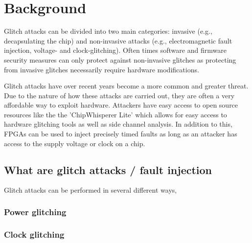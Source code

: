 

\chapter{Background}
\label{chap3}

Glitch attacks can be divided into two main categories: invasive (e.g., decapsulating the chip) and non-invasive attacks (e.g., electromagnetic fault injection, voltage- and clock-glitching)\cite{glitchresistor}. Often times software and firmware security measures can only protect against non-invasive glitches as protecting from invasive glitches necessarily require hardware modifications. 

Glitch attacks have over recent years become a more common and greater threat. Due to the nature of how these attacks are carried out, they are often a very affordable way to exploit hardware. Attackers have easy access to open source resources like the the 'ChipWhisperer Lite' which allows for easy access to hardware glitching tools as well as side channel analysis\cite{chipWhisperer}. In addition to this, FPGAs can be used to inject precisely timed faults as long as an attacker has access to the supply voltage or clock on a chip\cite{hole_in_soc}. 

\section{What are glitch attacks / fault injection}
\label{sec:glitch}

Glitch attacks can be performed in several different ways, 

\subsection{Power glitching}

\subsection{Clock glitching}

